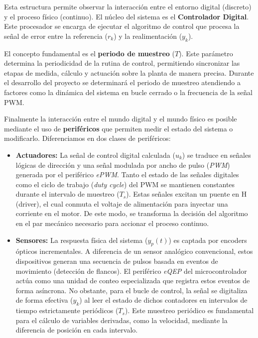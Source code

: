 \documentclass[11pt,fleqn]{book} %
\begin{document}
Esta estructura permite observar la interacción entre el entorno digital (discreto) y el proceso físico (continuo). El núcleo del sistema es el \textbf{Controlador Digital}. Este procesador se encarga de ejecutar el algoritmo de control que procesa la señal de error entre la referencia ($r_k$) y la realimentación ($y_k$). 

El concepto fundamental es el \textbf{periodo de muestreo} ($T$). Este parámetro determina la periodicidad de la rutina de control, permitiendo sincronizar las etapas de medida, cálculo y actuación sobre la planta de manera precisa. Durante el desarrollo del proyecto se determinará el periodo de muestreo atendiendo a factores como la dinámica del sistema en bucle cerrado o la frecuencia de la señal PWM. 

Finalmente la interacción entre el mundo digital y el mundo físico es posible mediante el uso de \textbf{periféricos} que permiten medir el estado del sistema o modificarlo. Diferenciamos en dos clases de periféricos: 
\begin{itemize}[]
	\item \textbf{Actuadores:} La señal de control digital calculada ($u_k$) se traduce en señales lógicas de dirección y una señal modulada por ancho de pulso (\textit{PWM}) generada por el periférico \textit{ePWM}. Tanto el estado de las señales digitales como el ciclo de trabajo (\textit{duty cycle}) del PWM se mantienen constantes durante el intervalo de muestreo ($T_s$). Estas señales excitan un puente en H (driver), el cual conmuta el voltaje de alimentación para inyectar una corriente en el motor. De este modo, se transforma la decisión del algoritmo en el par mecánico necesario para accionar el proceso continuo.
	
	\item \textbf{Sensores:} La respuesta física del sistema ($y_p(t)$) es captada por encoders ópticos incrementales. A diferencia de un sensor analógico convencional, estos dispositivos generan una secuencia de pulsos basada en eventos de movimiento (detección de flancos). El periférico \textit{eQEP} del microcontrolador actúa como una unidad de conteo especializada que registra estos eventos de forma asíncrona. No obstante, para el bucle de control, la señal se digitaliza de forma efectiva ($y_k$) al leer el estado de dichos contadores en intervalos de tiempo estrictamente periódicos ($T_s$). Este muestreo periódico es fundamental para el cálculo de variables derivadas, como la velocidad, mediante la diferencia de posición en cada intervalo.
\end{itemize}
\newpage
\end{document}
